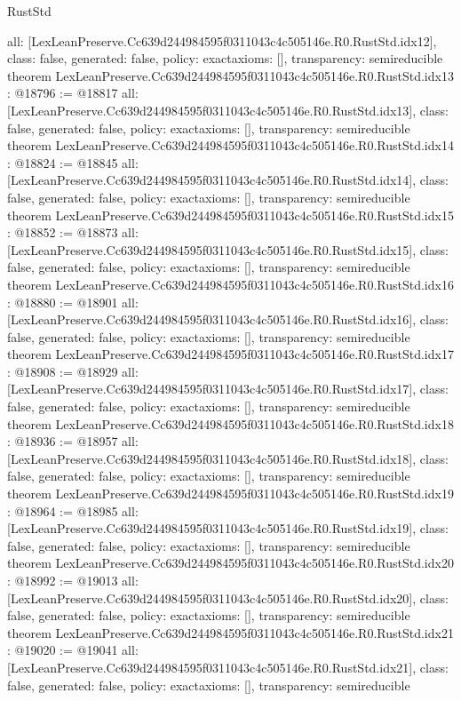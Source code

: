 \begin{lexlean}{RustStd}
\begin{coremodule}
{  all: [LexLeanPreserve.Cc639d244984595f0311043c4c505146e.R0.RustStd.idx12],
  class: false,
  generated: false,
  policy: exact{axioms: []},
  transparency: semireducible
}
theorem LexLeanPreserve.Cc639d244984595f0311043c4c505146e.R0.RustStd.idx13 : @18796 := @18817 {
  all: [LexLeanPreserve.Cc639d244984595f0311043c4c505146e.R0.RustStd.idx13],
  class: false,
  generated: false,
  policy: exact{axioms: []},
  transparency: semireducible
}
theorem LexLeanPreserve.Cc639d244984595f0311043c4c505146e.R0.RustStd.idx14 : @18824 := @18845 {
  all: [LexLeanPreserve.Cc639d244984595f0311043c4c505146e.R0.RustStd.idx14],
  class: false,
  generated: false,
  policy: exact{axioms: []},
  transparency: semireducible
}
theorem LexLeanPreserve.Cc639d244984595f0311043c4c505146e.R0.RustStd.idx15 : @18852 := @18873 {
  all: [LexLeanPreserve.Cc639d244984595f0311043c4c505146e.R0.RustStd.idx15],
  class: false,
  generated: false,
  policy: exact{axioms: []},
  transparency: semireducible
}
theorem LexLeanPreserve.Cc639d244984595f0311043c4c505146e.R0.RustStd.idx16 : @18880 := @18901 {
  all: [LexLeanPreserve.Cc639d244984595f0311043c4c505146e.R0.RustStd.idx16],
  class: false,
  generated: false,
  policy: exact{axioms: []},
  transparency: semireducible
}
theorem LexLeanPreserve.Cc639d244984595f0311043c4c505146e.R0.RustStd.idx17 : @18908 := @18929 {
  all: [LexLeanPreserve.Cc639d244984595f0311043c4c505146e.R0.RustStd.idx17],
  class: false,
  generated: false,
  policy: exact{axioms: []},
  transparency: semireducible
}
theorem LexLeanPreserve.Cc639d244984595f0311043c4c505146e.R0.RustStd.idx18 : @18936 := @18957 {
  all: [LexLeanPreserve.Cc639d244984595f0311043c4c505146e.R0.RustStd.idx18],
  class: false,
  generated: false,
  policy: exact{axioms: []},
  transparency: semireducible
}
theorem LexLeanPreserve.Cc639d244984595f0311043c4c505146e.R0.RustStd.idx19 : @18964 := @18985 {
  all: [LexLeanPreserve.Cc639d244984595f0311043c4c505146e.R0.RustStd.idx19],
  class: false,
  generated: false,
  policy: exact{axioms: []},
  transparency: semireducible
}
theorem LexLeanPreserve.Cc639d244984595f0311043c4c505146e.R0.RustStd.idx20 : @18992 := @19013 {
  all: [LexLeanPreserve.Cc639d244984595f0311043c4c505146e.R0.RustStd.idx20],
  class: false,
  generated: false,
  policy: exact{axioms: []},
  transparency: semireducible
}
theorem LexLeanPreserve.Cc639d244984595f0311043c4c505146e.R0.RustStd.idx21 : @19020 := @19041 {
  all: [LexLeanPreserve.Cc639d244984595f0311043c4c505146e.R0.RustStd.idx21],
  class: false,
  generated: false,
  policy: exact{axioms: []},
  transparency: semireducible
}
\end{coremodule}
\end{lexlean}
